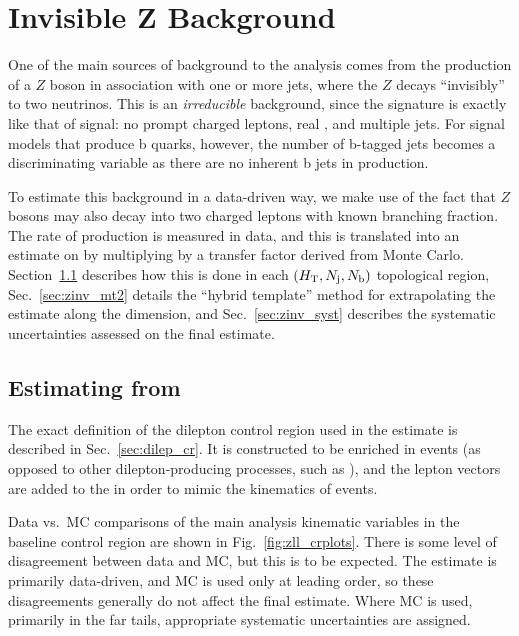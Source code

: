 \chapter{Invisible Z Background}
\label{chap:zinv}

One of the main sources of background to the \mttwo analysis comes from the production of a $Z$
boson in association with one or more jets, where the $Z$ decays ``invisibly'' to two neutrinos.
This is an \emph{irreducible} background, since the signature is exactly like that of signal:
no prompt charged leptons, real \ptmiss, and multiple jets. For signal models that produce
b quarks, however, the number of b-tagged jets becomes a discriminating variable as there are
no inherent b jets in \zjets production.

To estimate this background in a data-driven way, we make use of the fact that $Z$ bosons may also decay into two
charged leptons with known branching fraction. The rate of \zll production is measured in data, and this is
translated into an estimate on \znunu by multiplying by a transfer factor derived from Monte Carlo.
Section~\ref{sec:znunu_from_zll} describes how this is done in each $(H_{\mathrm{T}},N_{\mathrm{j}},N_{\mathrm{b}})$ topological region,
Sec.~\ref{sec:zinv_mt2} details the ``hybrid template'' method for extrapolating the estimate along the
\mttwo dimension, and Sec.~\ref{sec:zinv_syst} describes the systematic uncertainties assessed on the 
final estimate.

\section{Estimating \texorpdfstring{\znunu}{Z} from \texorpdfstring{\zll}{Zll}}
\label{sec:znunu_from_zll}
The exact definition of the dilepton control region used in the \znunu estimate is described in Sec.~\ref{sec:dilep_cr}.
It is constructed to be enriched in \zll events (as opposed to other dilepton-producing processes, such as \ttbar),
and the lepton  vectors are added to the \vMet in order to mimic the kinematics of \znunu events.

Data vs.\ MC comparisons of the main analysis kinematic variables in the baseline \zll control region are 
shown in Fig.~\ref{fig:zll_crplots}. There is some level of disagreement between data and MC, but this is
to be expected. The estimate is primarily data-driven, and MC is used only at leading order, so these
disagreements generally do not affect the final estimate. Where MC is used, primarily in the far
\mttwo tails, appropriate systematic uncertainties are assigned.

